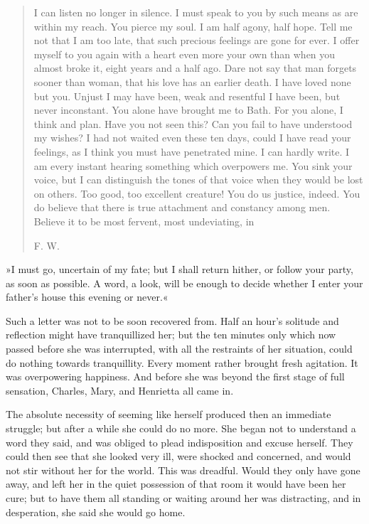 \begin{quotation}
\noindent I can listen no longer in silence. I must speak to you by such means as are within my reach. You pierce my soul. I am half agony, half hope. Tell me not that I am too late, that such precious feelings are gone for ever. I offer myself to you again with a heart even more your own than when you almost broke it, eight years and a half ago. Dare not say that man forgets sooner than woman, that his love has an earlier death. I have loved none but you. Unjust I may have been, weak and resentful I have been, but never inconstant. You alone have brought me to Bath. For you alone, I think and plan. Have you not seen this? Can you fail to have understood my wishes? I had not waited even these ten days, could I have read your feelings, as I think you must have penetrated mine. I can hardly write. I am every instant hearing something which overpowers me. You sink your voice, but I can distinguish the tones of that voice when they would be lost on others. Too good, too excellent creature! You do us justice, indeed. You do believe that there is true attachment and constancy among men. Believe it to be most fervent, most undeviating, in

\begin{flushright}
F. W.
\end{flushright}
\end{quotation}

»I must go, uncertain of my fate; but I shall return hither, or follow your party, as soon as possible. A word, a look, will be enough to decide whether I enter your father's house this evening or never.«

Such a letter was not to be soon recovered from. Half an hour's solitude and reflection might have tranquillized her; but the ten minutes only which now passed before she was interrupted, with all the restraints of her situation, could do nothing towards tranquillity. Every moment rather brought fresh agitation. It was overpowering happiness. And before she was beyond the first stage of full sensation, Charles, Mary, and Henrietta all came in.

The absolute necessity of seeming like herself produced then an immediate struggle; but after a while she could do no more. She began not to understand a word they said, and was obliged to plead indisposition and excuse herself. They could then see that she looked very ill, were shocked and concerned, and would not stir without her for the world. This was dreadful. Would they only have gone away, and left her in the quiet possession of that room it would have been her cure; but to have them all standing or waiting around her was distracting, and in desperation, she said she would go home.

